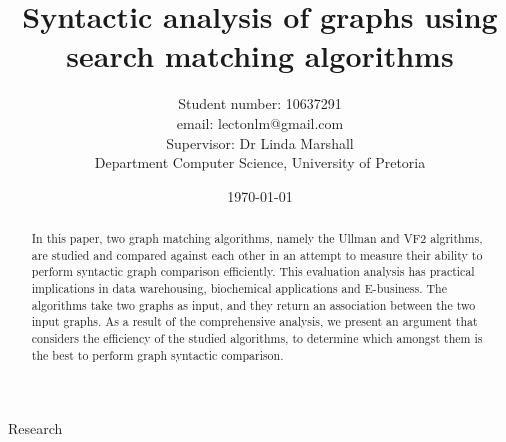 \documentclass[titlepage]{article}
\title{Syntactic analysis of graphs using search matching algorithms}
\author{Student number:  10637291\\
		email:  lectonlm@gmail.com\\
		Supervisor: Dr  Linda Marshall\\
		Department Computer Science, University of Pretoria}
\date{\today}
\begin{document}
\maketitle

\begin{abstract}
In this paper, two graph matching algorithms, namely the Ullman and VF2 algrithms, are studied and compared against each other in an attempt to measure their ability to perform syntactic graph comparison efficiently. This
evaluation analysis has practical implications in data warehousing, biochemical applications and E-business. The algorithms take two graphs as input, and they return an association between the two
input graphs. As a result of the comprehensive analysis, we present an argument that considers
the efficiency of the studied algorithms, to determine which amongst them is the best to 
perform graph syntactic comparison.
\end{abstract}
\tableofcontents
\newpage

{Research}
\end{document}
